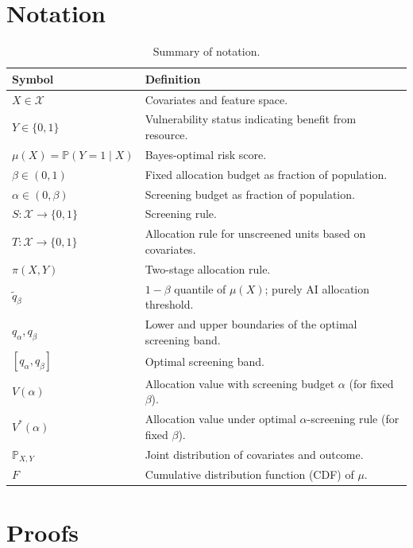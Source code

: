\appendix


\section{Notation}
\label{app:notation}
\begin{table}[h]
\centering
\begin{tabular}{ll}
\toprule
\textbf{Symbol} & \textbf{Definition} \\
\midrule
$X \in \mathcal{X}$ & Covariates and feature space. \\
$Y \in \{0,1\}$ & Vulnerability status indicating benefit from resource. \\
$\mu(X) = \mathbb{P}(Y=1 \mid X)$ & Bayes-optimal risk score. \\
$\beta \in (0,1)$ & Fixed allocation budget as fraction of population. \\
$\alpha \in (0,\beta)$ & Screening budget as fraction of population. \\
$S: \mathcal{X} \to \{0,1\}$ & Screening rule. \\
$T: \mathcal{X} \to \{0,1\}$ & Allocation rule for unscreened units based on covariates. \\
$\pi(X, Y)$ & Two-stage allocation rule. \\
$\widetilde{q}_\beta$ & $1-\beta$ quantile of $\mu(X)$; purely AI allocation threshold. \\
$q_\alpha, q_\beta$ & Lower and upper boundaries of the optimal screening band. \\
$[q_\alpha, q_\beta]$ & Optimal screening band. \\
$V(\alpha)$ & Allocation value with screening budget $\alpha$ (for fixed $\beta$). \\
$V^{*}(\alpha)$ & Allocation value under optimal $\alpha$-screening rule (for fixed $\beta$). \\
$\mathbb{P}_{X,Y}$ & Joint distribution of covariates and outcome. \\
$F$ & Cumulative distribution function (CDF) of $\mu$. \\ 
\bottomrule
\end{tabular}
\caption{Summary of notation.}
\label{tab:notation}
\end{table}


\section{Proofs}
\label{app:proofs}

